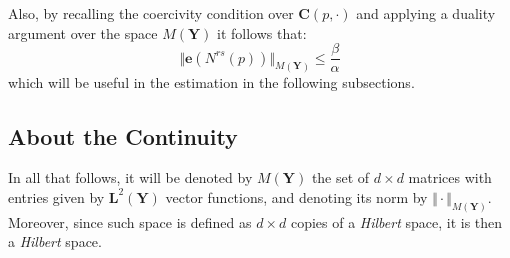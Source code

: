 Also, by recalling the coercivity condition over $\mathbf{C}(p, \cdot)$ and applying a duality argument over the space $M(\mathbf{Y})$ it follows that:
\begin{equation}
    \label{eq:Estimate-Nrs}
    \Vert \mathbf{e}(N^{rs}(p))\Vert_{M(\mathbf{Y})} \leq \frac{\beta}{\alpha}
\end{equation}
which will be useful in the estimation in the following subsections.
\subsection{About the Continuity}

In all that follows, it will be denoted by $M(\mathbf{Y})$ the set of $d \times d$ matrices with entries given by $\mathbf{L}^2(\mathbf{Y})$ vector functions, and denoting its norm by $\Vert \cdot \Vert_{M(\mathbf{Y})}$. Moreover, since such space is defined as $d \times d$ copies of a \textit{Hilbert} space, it is then a \textit{Hilbert} space. %

